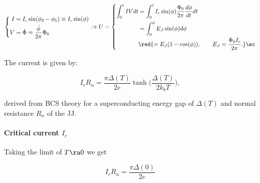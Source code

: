   \begin{equation}
    \left\lbrace\begin{aligned}
        I &= I_c\sin(\phi_2-\phi_1)\equiv I_c\sin(\phi)\\
        V&=\dot{\Phi} \equiv \frac{\dot{\phi}}{2\pi}\Phi_0
      \end{aligned}\right. \Rightarrow U = \left\lbrace\begin{aligned}
        \int_{0}^{t}IV dt & = \int_{0}^{t}I_c\sin(\phi)\frac{\Phi_0}{2\pi}\frac{d\phi}{dt}dt\\
        & = \int_{0}^{\phi} E_J\sin(\phi)d\phi\\
        & \red{= E_J(1-\cos(\phi)),\qquad E_J = \frac{\Phi_0I_c}{2\pi}.}\ec
      \end{aligned}\right.
    \label{l2-JJEnergy}
  \end{equation} 
  
  \noindent The current is given by:
  
  \begin{equation}\label{key}
    I_cR_n = \frac{\pi\Delta(T)}{2e}\tanh\big(\frac{\Delta(T)}{2k_bT}\big),
  \end{equation}
  
  \noindent derived from  BCS theory for a superconducting  energy gap of $ \Delta(T)  $ and normal
  resistance $ R_n $ of the JJ.
  
  {
    \paragraph{Critical current $ I_c $}
    Taking the limit of $ T\ra0 $ we get
  
  	 \begin{equation}\label{app:criticalCurrent}
           I_cR_n = \frac{\pi\Delta(0)}{2e}
  	 \end{equation}
       }
 

